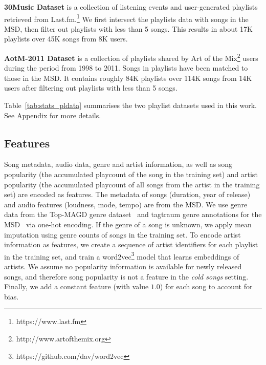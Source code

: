 %

\noindent
{\bf 30Music Dataset} is a collection of listening events and user-generated
playlists retrieved from Last.fm.\footnote{https://www.last.fm}
We first intersect the playlists data with songs in the MSD, 
then filter out playlists with less than 5 songs.
This results in about 17K playlists over 45K songs from 8K users.

\noindent
{\bf AotM-2011 Dataset} is a collection of playlists shared by Art of the Mix\footnote{http://www.artofthemix.org} 
users during the period from 1998 to 2011. Songs in playlists have been matched to those in the MSD.
It contains 
roughly 84K playlists over 114K songs from 14K users
after filtering out playlists with less than 5 songs.

Table~\ref{tab:stats_pldata} summarises the two 
playlist datasets used in this work.
See Appendix for more details.


\subsection{Features}

Song metadata, audio data, genre and artist information, as well as song popularity
(\ie the accumulated playcount of the song in the training set)
and artist popularity 
(\ie the accumulated playcount of all songs from the artist in the training set)
are encoded as features.
%
The metadata of songs (\eg duration, year of release) and audio features (\eg loudness, mode, tempo) are from the MSD.
We use genre data from the Top-MAGD genre dataset~\cite{schindler2012facilitating}
and tagtraum genre annotations for the MSD~\cite{schreiber2015improving} via one-hot encoding.
If the genre of a song is unknown, 
we apply mean imputation using genre counts of songs in the training set.
To encode artist information as features,
we create a sequence of artist identifiers for each playlist in the training set, and train
a word2vec\footnote{https://github.com/dav/word2vec} model that learns embeddings of artists.
%
We assume no popularity information is available for newly released songs,
and therefore song popularity is not a feature in the \emph{cold songs} setting.
Finally, we add a constant feature (with value $1.0$) for each song to account for bias.


